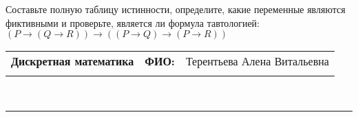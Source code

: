 \documentclass[10pt]{exam}
\newcommand{\class}{Дискретная математика}
\newcommand{\examdate}{}
\begin{document}
\begin{questions}
\begin{enumerate}[a)]
\end{enumerate}\question Составьте полную таблицу истинности, определите, какие переменные являются фиктивными и проверьте, является ли формула тавтологией:
$(P \rightarrow (Q \rightarrow R)) \rightarrow ((P \rightarrow Q) \rightarrow (P \rightarrow R))$

\end{questions}
\newpage
\begin{flushright}
\begin{tabular}{p{2.8in} r l}
\textbf{\class} & \textbf{ФИО:} &Терентьева Алена Витальевна
\\

\textbf{\examdate} &&\\
\end{tabular}\\
\end{flushright}
\rule[1ex]{\textwidth}{.1pt}
\end{document}

